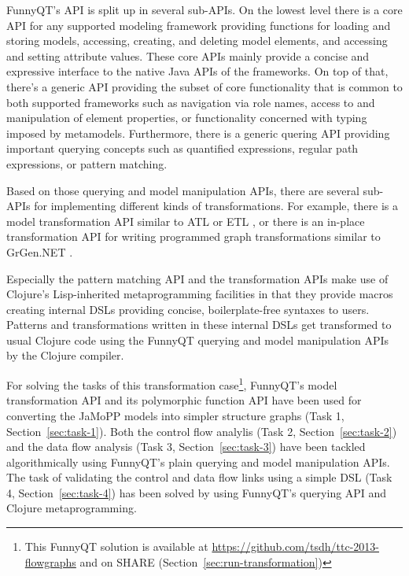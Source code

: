 \documentclass[11pt]{article}
\begin{document}
FunnyQT's API is split up in several sub-APIs.  On the lowest level there is a
core API for any supported modeling framework providing functions for loading
and storing models, accessing, creating, and deleting model elements, and
accessing and setting attribute values.  These core APIs mainly provide a
concise and expressive interface to the native Java APIs of the frameworks.  On
top of that, there's a generic API providing the subset of core functionality
that is common to both supported frameworks such as navigation via role names,
access to and manipulation of element properties, or functionality concerned
with typing imposed by metamodels.  Furthermore, there is a generic quering API
providing important querying concepts such as quantified expressions, regular
path expressions, or pattern matching.

Based on those querying and model manipulation APIs, there are several sub-APIs
for implementing different kinds of transformations.  For example, there is a
model transformation API similar to ATL \cite{ATL05} or ETL
\cite{booklet:epsilon}, or there is an in-place transformation API for writing
programmed graph transformations similar to GrGen.NET
\cite{manual:GrGenManual}.

Especially the pattern matching API and the transformation APIs make use of
Clojure's Lisp-inherited metaprogramming facilities
\cite{Graham1993OnLisp,Hoyte08LoL} in that they provide macros creating
internal DSLs \cite{book:Fowler2010DSL} providing concise, boilerplate-free
syntaxes to users.  Patterns and transformations written in these internal DSLs
get transformed to usual Clojure code using the FunnyQT querying and model
manipulation APIs by the Clojure compiler.

For solving the tasks of this transformation case\footnote{This FunnyQT
  solution is available at \url{https://github.com/tsdh/ttc-2013-flowgraphs}
  and on SHARE (Section~\ref{sec:run-transformation})}, FunnyQT's model
transformation API and its polymorphic function API have been used for
converting the JaMoPP models into simpler structure graphs (Task 1,
Section~\ref{sec:task-1}).  Both the control flow analylis (Task 2,
Section~\ref{sec:task-2}) and the data flow analysis (Task 3,
Section~\ref{sec:task-3}) have been tackled algorithmically using FunnyQT's
plain querying and model manipulation APIs.  The task of validating the control
and data flow links using a simple DSL (Task 4, Section~\ref{sec:task-4}) has
been solved by using FunnyQT's querying API and Clojure metaprogramming.
\end{document}
